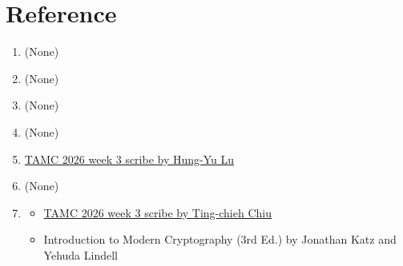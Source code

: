 


\clearpage
{}


\clearpage
{}


\clearpage
{}


\clearpage
{}


\clearpage
{}


\clearpage
{}








\clearpage
\section*{Reference}
\begin{enumerate}
    \item[P1] (None)
    \item[P2] (None)
    \item[P3] (None)
    \item[P4] (None)
    \item[P5] \href{https://www.overleaf.com/read/ztqhjjmxtzxk#bb6b6c}{TAMC 2026 week 3 scribe by Hung-Yu Lu}
    \item[P6] (None)
    \item[P7] 
        \begin{itemize}
            \item \href{https://www.overleaf.com/read/bwqjbysnxckn#217e56}{TAMC 2026 week 3 scribe by Ting-chieh Chiu}
            \item Introduction to Modern Cryptography (3rd Ed.) by Jonathan Katz and Yehuda Lindell
        \end{itemize}
\end{enumerate}
